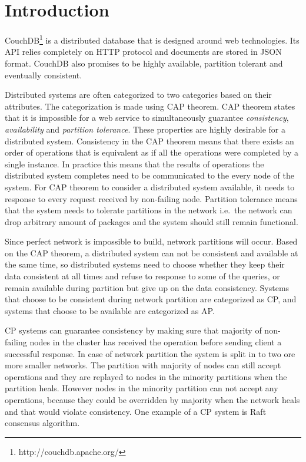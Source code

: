 \section{Introduction}

CouchDB\footnote{http://couchdb.apache.org/} is a distributed database that is
designed around web technologies. Its API relies completely on HTTP protocol and
documents are stored in JSON format. CouchDB also promises to be highly
available, partition tolerant and eventually consistent.

Distributed systems are often categorized to two categories based on their
attributes. The categorization is made using CAP
theorem\cite{gilbert2002brewer}. CAP theorem states that it is impossible for a
web service to simultaneously guarantee \emph{consistency}, \emph{availability}
and \emph{partition tolerance}. These properties are highly desirable for a
distributed system.  Consistency in the CAP theorem means that there exists an
order of operations that is equivalent as if all the operations were completed
by a single instance. In practice this means that the results of operations the
distributed system completes need to be communicated to the every node of the
system. For CAP theorem to consider a distributed system available, it needs to
response to every request received by non-failing node. Partition tolerance
means that the system needs to tolerate partitions in the network i.e.\ the
network can drop arbitrary amount of packages and the system should still
remain functional.

Since perfect network is impossible to build, network partitions will occur.
Based on the CAP theorem, a distributed system can not be consistent and
available at the same time, so distributed systems need to choose whether they
keep their data consistent at all times and refuse to response to some of the
queries, or remain available during partition but give up on the data
consistency. Systems that choose to be consistent during network partition are
categorized as CP, and systems that choose to be available are categorized as
AP.\

CP systems can guarantee consistency by making sure that majority of non-failing
nodes in the cluster has received the operation before sending client a
successful response. In case of network partition the system is split in to two
ore more smaller networks. The partition with majority of nodes can still accept
operations and they are replayed to nodes in the minority partitions when the
partition heals. However nodes in the minority partition can not accept any
operations, because they could be overridden by majority when the network heals
and that would violate consistency. One example of a CP system is
Raft consensus algorithm\cite{ongaro2014search}.

